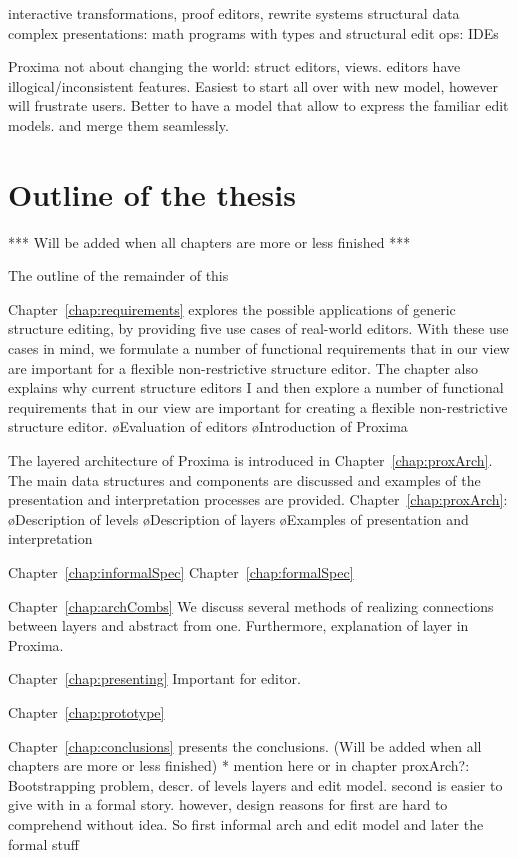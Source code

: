 interactive transformations, proof editors, rewrite systems
structural data complex presentations: math
programs with types and structural edit ops: IDEs

Proxima not about changing the world: struct editors, views.  editors have illogical/inconsistent features. Easiest to start all over with new model, however will frustrate users. Better to have a model that allow to express the familiar edit models. and merge them seamlessly.
\ec


\section{Outline of the thesis}

*** Will be added when all chapters are more or less finished ***

The outline of the remainder of this 

Chapter~\ref{chap:requirements} explores the possible applications of generic structure editing, by providing five use cases of real-world editors. With these use cases in mind, we formulate a number of functional requirements that in our view are important for a flexible non-restrictive structure editor. The chapter also explains why current structure editors 
\bc
 I and then explore a number of functional requirements that in our view are important for creating a flexible non-restrictive structure editor.
\ec
\bl
\o Evaluation of editors
\o Introduction of Proxima
\el

The layered architecture of Proxima is introduced in Chapter~\ref{chap:proxArch}. The main data structures and components are discussed and examples of the presentation and interpretation processes are provided.
Chapter~\ref{chap:proxArch}:
\bl
\o Description of levels
\o Description of layers
\o Examples of presentation and interpretation
\el


Chapter~\ref{chap:informalSpec} 
Chapter~\ref{chap:formalSpec}

Chapter~\ref{chap:archCombs}
We discuss several methods of realizing connections between layers and abstract from one. Furthermore, explanation of layer in Proxima.

Chapter~\ref{chap:presenting} Important for editor.

Chapter~\ref{chap:prototype}

Chapter~\ref{chap:conclusions} presents the conclusions.  %
(Will be added when all chapters are more or less finished)
\bc
* mention here or in chapter proxArch?:
Bootstrapping problem, descr. of levels layers and edit model. second is easier to give with in a formal story. however, design reasons for first are hard to comprehend without idea. So first informal arch and edit model and later the formal stuff

